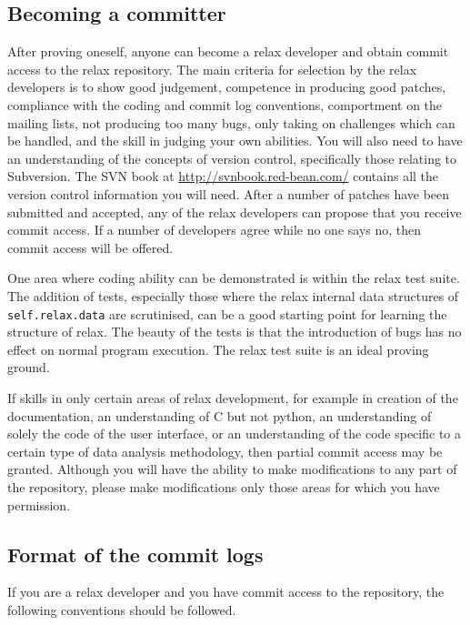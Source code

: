 \subsection{Becoming a committer}

After proving oneself, anyone can become a relax developer and obtain commit access to the relax repository.  The main criteria for selection by the relax developers is to show good judgement, competence in producing good patches, compliance with the coding and commit log conventions, comportment on the mailing lists, not producing too many bugs, only taking on challenges which can be handled, and the skill in judging your own abilities.  You will also need to have an understanding of the concepts of version control, specifically those relating to Subversion.  The SVN book at \href{http://svnbook.red-bean.com/}{http://svnbook.red-bean.com/} contains all the version control information you will need.  After a number of patches have been submitted and accepted, any of the relax developers can propose that you receive commit access.  If a number of developers agree while no one says no, then commit access will be offered.

One area where coding ability can be demonstrated is within the relax test suite.  The addition of tests, especially those where the relax internal data structures of \texttt{self.relax.data} are scrutinised, can be a good starting point for learning the structure of relax.  The beauty of the tests is that the introduction of bugs has no effect on normal program execution.  The relax test suite is an ideal proving ground.

If skills in only certain areas of relax development, for example in creation of the documentation, an understanding of C but not python, an understanding of solely the code of the user interface, or an understanding of the code specific to a certain type of data analysis methodology, then partial commit access may be granted.  Although you will have the ability to make modifications to any part of the repository, please make modifications only those areas for which you have permission.


\subsection{Format of the commit logs}\label{commit log format}

If you are a relax developer and you have commit access to the repository, the following conventions should be followed.

